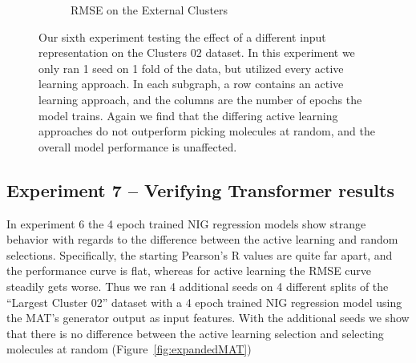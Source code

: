 \documentclass[journal=jmcmar,manuscript=article]{achemso}
\begin{document}
\begin{figure}[tbph]
\begin{subfigure}[b]{0.48\textwidth}
        \caption{RMSE on the External Clusters}
    \end{subfigure}
    \caption{Our sixth experiment testing the effect of a different input representation on the Clusters 02 dataset. In this experiment we only ran 1 seed on 1 fold of the data, but utilized every active learning approach. In each subgraph, a row contains an active learning approach, and the columns are the number of epochs the model trains. Again we find that the differing active learning approaches do not outperform picking molecules at random, and the overall model performance is unaffected.}
    \label{fig:MATinput}
\end{figure}

\subsection{Experiment 7 -- Verifying Transformer results}

In experiment 6 the 4 epoch trained NIG regression models show strange behavior with regards to the difference between the active learning and random selections. Specifically, the starting Pearson's R values are quite far apart, and the performance curve is flat, whereas for active learning the RMSE curve steadily gets worse. Thus we ran 4 additional seeds on 4 different splits of the ``Largest Cluster 02'' dataset with a 4 epoch trained NIG regression model using the MAT's generator output as input features. With the additional seeds we show that there is no difference between the active learning selection and selecting molecules at random (Figure~\ref{fig:expandedMAT})
\end{document}

